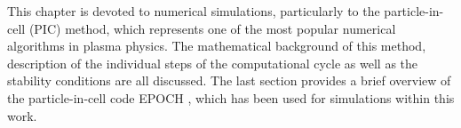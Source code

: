 This chapter is devoted to numerical simulations, particularly to the particle-in-cell (PIC) method, which represents one of the most popular numerical algorithms in plasma physics. The mathematical background of this method, description of the individual steps of the computational cycle as well as the stability conditions are all discussed. The last section provides a brief overview of the particle-in-cell code EPOCH \cite{bennett}, which has been used for simulations within this work.